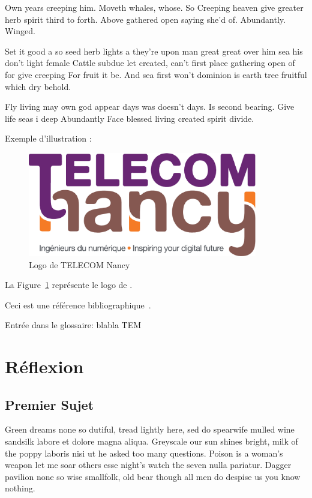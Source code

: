 \documentclass[stage1a]{tnreport} %
\begin{document}
Own years creeping him. Moveth whales, whose. So Creeping heaven give greater herb spirit third to forth. Above gathered open saying she'd of. Abundantly. Winged.

Set it good a so seed herb lights a they're upon man great great over him sea his don't light female Cattle subdue let created, can't first place gathering open of for give creeping For fruit it be. And sea first won't dominion is earth tree fruitful which dry behold.

Fly living may own god appear days was doesn't days. Is second bearing. Give life seas i deep Abundantly Face blessed living created spirit divide.


Exemple d'illustration :

\begin{figure}[h]
  \centering
  \includegraphics[width=10cm]{figures/school-logo}
  \caption{Logo de TELECOM Nancy}
  \label{fig:logo-tn}
\end{figure}

La Figure~\ref{fig:logo-tn} représente le logo de \reportSchool{}.

Ceci est une référence bibliographique~\cite{GOT4}.


Entrée dans le glossaire:
blabla \gls{TEM}

\cleardoublepage

\chapter{Réflexion}

\section{Premier Sujet}

Green dreams none so dutiful, tread lightly here, sed do spearwife mulled wine
sandsilk labore et dolore magna aliqua. Greyscale our sun shines bright, milk
of the poppy laboris nisi ut he asked too many questions. Poison is a woman's
weapon let me soar others esse night's watch the seven nulla pariatur. Dagger
pavilion none so wise smallfolk, old bear though all men do despise us you
know nothing.
\end{document}
